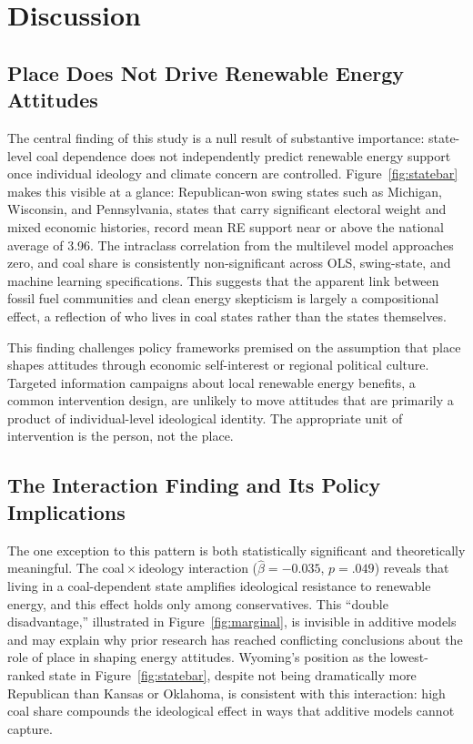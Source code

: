 \documentclass[9pt,twoside]{pnas-new}
\begin{document}
\section*{Discussion}

\subsection*{Place Does Not Drive Renewable Energy Attitudes}

The central finding of this study is a null result of substantive importance:
state-level coal dependence does not independently predict renewable energy
support once individual ideology and climate concern are controlled. Figure~\ref{fig:statebar}
makes this visible at a glance: Republican-won swing states such as Michigan,
Wisconsin, and Pennsylvania, states that carry significant electoral weight and
mixed economic histories, record mean RE support near or above the national
average of 3.96. The intraclass correlation from the multilevel model approaches
zero, and coal share is consistently non-significant across OLS, swing-state, and
machine learning specifications. This suggests that the apparent link between
fossil fuel communities and clean energy skepticism is largely a compositional
effect, a reflection of who lives in coal states rather than the states themselves.

This finding challenges policy frameworks premised on the assumption that place
shapes attitudes through economic self-interest or regional political culture.
Targeted information campaigns about local renewable energy benefits, a common
intervention design, are unlikely to move attitudes that are primarily a product
of individual-level ideological identity. The appropriate unit of intervention
is the person, not the place.

\subsection*{The Interaction Finding and Its Policy Implications}

The one exception to this pattern is both statistically significant and
theoretically meaningful. The coal\,$\times$\,ideology interaction
($\hat{\beta} = -0.035$, $p = .049$) reveals that living in a coal-dependent
state amplifies ideological resistance to renewable energy, and this effect
holds only among conservatives. This ``double disadvantage,'' illustrated in
Figure~\ref{fig:marginal}, is invisible in additive models and may explain why
prior research has reached conflicting conclusions about the role of place in
shaping energy attitudes. Wyoming's position as the lowest-ranked state in
Figure~\ref{fig:statebar}, despite not being dramatically more Republican than
Kansas or Oklahoma, is consistent with this interaction: high coal share
compounds the ideological effect in ways that additive models cannot capture.
\end{document}

